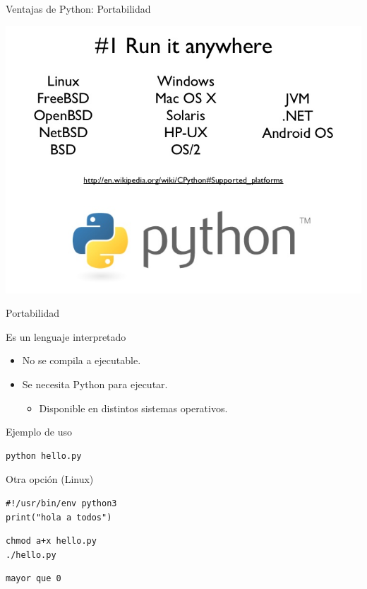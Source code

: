 \documentclass[bigger,unknownkeysallowed]{beamer}
\begin{document}
\begin{frame}[label={sec:org3cc30f7}]{Ventajas de Python: Portabilidad}
\begin{center}
\includegraphics[width=\textwidth]{runanywhere.jpg}
\end{center}
\end{frame}


\begin{frame}[fragile,label={sec:orged132b1}]{Portabilidad}
 \begin{block}{Es un lenguaje interpretado}
\begin{itemize}
\item No se compila a ejecutable.

\item Se necesita Python para ejecutar.

\begin{itemize}
\item Disponible en distintos sistemas operativos.
\end{itemize}
\end{itemize}
\end{block}

\begin{block}{Ejemplo de uso}
\begin{verbatim}
python hello.py
\end{verbatim}
\scriptsize
\end{block}
\begin{block}{Otra opción (Linux)}
\begin{verbatim}
#!/usr/bin/env python3
print("hola a todos")
\end{verbatim}

\begin{verbatim}
chmod a+x hello.py
./hello.py
\end{verbatim}
\scriptsize
\begin{verbatim}
mayor que 0
\end{verbatim}
\end{block}
\end{frame}
\end{document}

